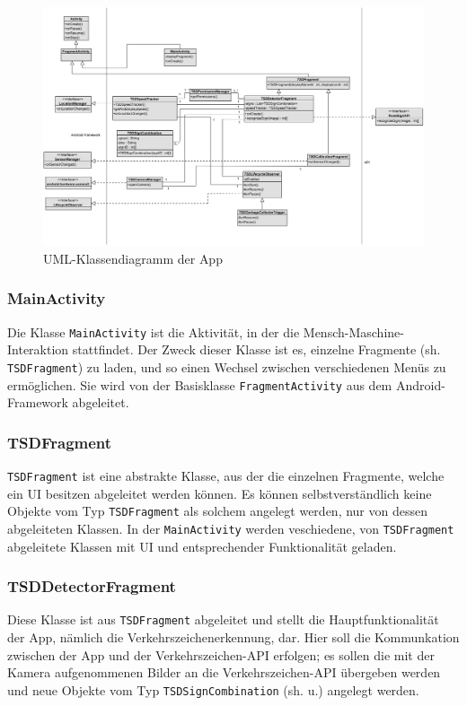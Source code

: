 \documentclass[12pt,a4paper,ngerman,enabledeprecatedfontcommands]{scrreprt}
\begin{document}
\begin{landscape}
\begin{figure}
\label{fig:klassen_app}
\centering
\includegraphics[width=0.95\linewidth]{Reviewdokument/Grafiken/app_class_diagram.png}
\caption{UML-Klassendiagramm der \gls{App}}
\end{figure}
\end{landscape}

\subsubsection*{MainActivity}
Die Klasse \texttt{MainActivity} ist die Aktivität, in der die Mensch-Maschine-Interaktion stattfindet. Der Zweck dieser Klasse ist es, einzelne Fragmente (sh. \texttt{TSDFragment}) zu laden, und so einen Wechsel zwischen verschiedenen Menüs zu ermöglichen. Sie wird von der Basisklasse \texttt{FragmentActivity} aus dem Android-Framework abgeleitet.\\

\subsubsection*{TSDFragment}
\texttt{TSDFragment} ist eine abstrakte Klasse, aus der die einzelnen Fragmente, welche ein \gls{UI} besitzen abgeleitet werden können. Es können selbstverständlich keine Objekte vom Typ \texttt{TSDFragment} als solchem angelegt werden, nur von dessen abgeleiteten Klassen. In der \texttt{MainActivity} werden veschiedene, von \texttt{TSDFragment} abgeleitete Klassen mit \gls{UI} und entsprechender Funktionalität geladen.\\

\subsubsection*{TSDDetectorFragment}
Diese Klasse ist aus \texttt{TSDFragment} abgeleitet und stellt die Hauptfunktionalität der App, nämlich die Verkehrszeichenerkennung, dar. Hier soll die Kommunkation zwischen der App und der \gls{Verkehrszeichen-API} erfolgen; es sollen die mit der Kamera aufgenommenen Bilder an die \gls{Verkehrszeichen-API} übergeben werden und neue Objekte vom Typ \texttt{TSDSignCombination} (sh. u.) angelegt werden.\\
\end{document}
